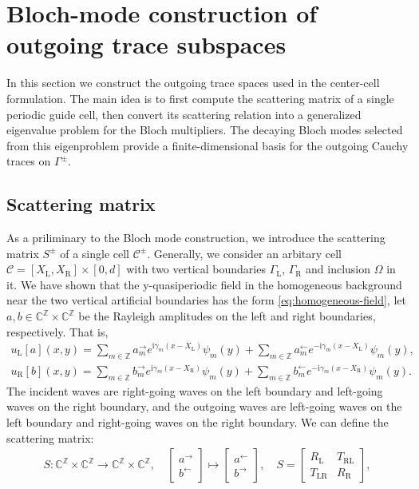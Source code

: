 \documentclass[11pt,fleqn]{article}
\newcommand{\ii}{\mathrm{i}}
\theoremstyle{definition}
\theoremstyle{remark}
\begin{document}
\section{Bloch-mode construction of outgoing trace subspaces}
In this section we construct the outgoing trace spaces used in the center-cell
formulation. The main idea is to first compute the scattering matrix of a
single periodic guide cell, then convert its scattering relation into a
generalized eigenvalue problem for the Bloch multipliers. The decaying Bloch
modes selected from this eigenproblem provide a finite-dimensional basis for
the outgoing Cauchy traces on \(\Gamma^\pm\).

\subsection{Scattering matrix}
As a priliminary to the Bloch mode construction, we introduce the scattering matrix $S^\pm$
of a single cell $\mathcal{C}^\pm$. Generally, we consider an arbitary cell 
$\mathcal{C} = [X_\mathrm{L}, X_\mathrm{R}] \times [0,d]$ with two vertical boundaries $\Gamma_\mathrm{L}$, $\Gamma_\mathrm{R}$ and inclusion $\Omega$ in it.
We have shown that the y-quasiperiodic field in the 
homogeneous background near the two vertical artificial boundaries has the form \eqref{eq:homogeneous-field}, let $a, b \in \mathbb{C}^\mathbb{Z} \times \mathbb{C}^\mathbb{Z}$ 
be the Rayleigh amplitudes on the left and right boundaries, respectively. That is, 
\begin{align*}
  u_\mathrm{L}[a](x,y) = \sum_{m\in\mathbb{Z}} a_m^\rightarrow e^{\ii \gamma_m (x - X_\mathrm{L})} \psi_m(y) + \sum_{m\in\mathbb{Z}} a_m^\leftarrow e^{-\ii \gamma_m (x - X_\mathrm{L})} \psi_m(y),\\
  u_\mathrm{R}[b](x,y) = \sum_{m\in\mathbb{Z}} b_m^\rightarrow e^{\ii \gamma_m (x - X_\mathrm{R})} \psi_m(y) + \sum_{m\in\mathbb{Z}} b_m^\leftarrow e^{-\ii \gamma_m (x - X_\mathrm{R})} \psi_m(y).
\end{align*}
The incident waves are right-going waves on the left boundary and left-going waves on the right boundary, and the outgoing waves are left-going waves on the left boundary and right-going waves on the right boundary. We can define the scattering matrix: 
\begin{align}
  S: \mathbb{C}^\mathbb{Z} \times \mathbb{C}^\mathbb{Z} \to \mathbb{C}^\mathbb{Z} \times \mathbb{C}^\mathbb{Z},\quad
  \begin{bmatrix}
    a^\rightarrow\\
    b^\leftarrow
  \end{bmatrix}
  \mapsto
  \begin{bmatrix}
    a^\leftarrow\\
    b^\rightarrow
  \end{bmatrix},\quad
  S = \begin{bmatrix}
    R_\mathrm{L} & T_{\mathrm{RL}}\\
    T_{\mathrm{LR}} & R_\mathrm{R}
  \end{bmatrix},
\end{align}
\end{document}
